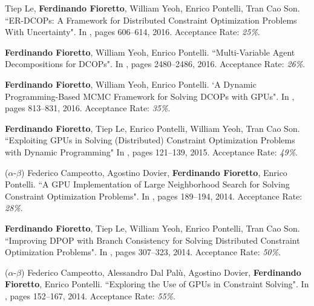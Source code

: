 \item 
	Tiep Le, {\bf Ferdinando Fioretto}, William Yeoh, Enrico Pontelli, Tran Cao Son. 
	{``ER-DCOPs: A Framework for Distributed Constraint Optimization Problems With Uncertainty"}. 
	In  \procAAMAS,	pages 606--614, 2016.
	Acceptance Rate: {\it 25\%}.%

\item 
	{\bf Ferdinando Fioretto}, William Yeoh, Enrico Pontelli.
	{``Multi-Variable Agent Decompositions for DCOPs"}. 
	In \procAAAI, pages 2480--2486, 2016.
	Acceptance Rate: {\it 26\%}.%

\item 
	{\bf Ferdinando Fioretto}, William Yeoh, Enrico Pontelli. 
	{`A Dynamic Programming-Based MCMC Framework for Solving DCOPs with GPUs"}.
	In \procCP, pages 813--831,	2016. 
	Acceptance Rate: {\it 35\%}.%


\item
	{\bf Ferdinando Fioretto}, Tiep Le, Enrico Pontelli, William Yeoh, Tran Cao Son.
	{``Exploiting GPUs in Solving (Distributed) Constraint Optimization Problems with Dynamic Programming"}
	In \procCP, pages 121--139, 2015.
	Acceptance Rate: {\it  49\%}.%


					
\item
	($\alpha$-$\beta$) 
	Federico Campeotto, Agostino Dovier, {\bf Ferdinando Fioretto}, Enrico Pontelli. 
	{``A GPU Implementation of Large Neighborhood Search for Solving Constraint Optimization Problems"}. 
	In \procECAI, pages 189--194, 2014.
	Acceptance Rate: {\it 28\%}.

\item
	{\bf Ferdinando Fioretto}, Tiep Le, William Yeoh, Enrico Pontelli, Tran Cao Son. 
	{``Improving DPOP with Branch Consistency for Solving Distributed Constraint Optimization Problems"}.
	In \procCP, pages 307--323, 2014.
	Acceptance Rate: {\it 50\%}.
	
\item
	($\alpha$-$\beta$) 
	Federico Campeotto, Alessandro Dal Pal\`{u}, Agostino Dovier, {\bf Ferdinando Fioretto}, Enrico Pontelli. 
	{``Exploring the Use of GPUs in Constraint Solving"}. 
	In \procPADL, pages 152--167, 2014.
	Acceptance Rate: {\it 55\%}.



